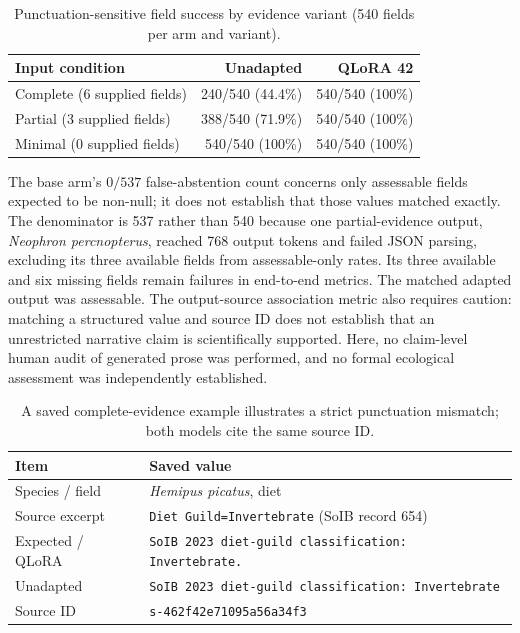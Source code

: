 \documentclass[a4paper,conference,10pt]{IEEEtran}
\begin{document}
\begin{table}[t]
\centering
\caption{Punctuation-sensitive field success by evidence variant (540 fields per arm and variant).}
\label{tab:variants}
\footnotesize
\begin{tabularx}{\columnwidth}{@{}>{\raggedright\arraybackslash}Xrr@{}}
\toprule
\textbf{Input condition} & \textbf{Unadapted} & \textbf{QLoRA 42}\\
\midrule
Complete (6 supplied fields) & 240/540 (44.4\%) & 540/540 (100\%)\\
Partial (3 supplied fields) & 388/540 (71.9\%) & 540/540 (100\%)\\
Minimal (0 supplied fields) & 540/540 (100\%) & 540/540 (100\%)\\
\bottomrule
\end{tabularx}
\end{table}

The base arm's $0/537$ false-abstention count concerns only assessable fields expected to be non-null; it does not establish that those values matched exactly. The denominator is 537 rather than 540 because one partial-evidence output, \textit{Neophron percnopterus}, reached 768 output tokens and failed JSON parsing, excluding its three available fields from assessable-only rates. Its three available and six missing fields remain failures in end-to-end metrics. The matched adapted output was assessable. The output-source association metric also requires caution: matching a structured value and source ID does not establish that an unrestricted narrative claim is scientifically supported. Here, no claim-level human audit of generated prose was performed, and no formal ecological assessment was independently established.

\begin{table}[t]
\centering
\caption{A saved complete-evidence example illustrates a strict punctuation mismatch; both models cite the same source ID.}
\label{tab:example}
\footnotesize
\begin{tabularx}{\columnwidth}{@{}lX@{}}
\toprule
\textbf{Item} & \textbf{Saved value} \\
\midrule
Species / field & \textit{Hemipus picatus}, diet \\
Source excerpt & \texttt{Diet Guild=Invertebrate} (SoIB record 654) \\
Expected / QLoRA & \texttt{SoIB 2023 diet-guild classification: Invertebrate.} \\
Unadapted & \texttt{SoIB 2023 diet-guild classification: Invertebrate} \\
Source ID & \texttt{s-462f42e71095a56a34f3} \\
\bottomrule
\end{tabularx}
\end{table}
\end{document}

